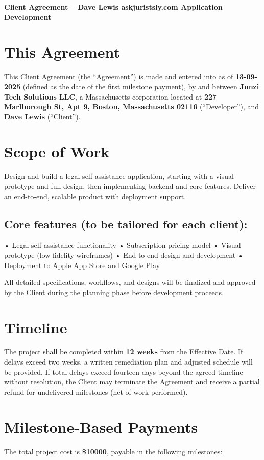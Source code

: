 \documentclass[11pt,letterpaper]{article}
\newcommand{\ClientName}{Dave Lewis}
\newcommand{\AppName}{askjuristsly.com}
\newcommand{\EffectiveDate}{13-09-2025}
\newcommand{\TimeLine}{12 weeks}
\newcommand{\TotalCost}{10000}
\newcommand{\FeaturesListPlaceholder}{• Legal self-assistance functionality
• Subscription pricing model
• Visual prototype (low-fidelity wireframes)
• End-to-end design and development
• Deployment to Apple App Store and Google Play}
\newcommand{\ScopeDescription}{Design and build a legal self-assistance application, starting with a visual prototype and full design, then implementing backend and core features. Deliver an end-to-end, scalable product with deployment support.}
\begin{document}
\begin{center}
\Large\textbf{Client Agreement -- \ClientName{} \AppName{} Application Development}
\end{center}

\vspace{1em}

\section*{This Agreement}
This Client Agreement (the ``Agreement'') is made and entered into as of \textbf{\EffectiveDate{}} (defined as the date of the first milestone payment), by and between \textbf{Junzi Tech Solutions LLC}, a Massachusetts corporation located at \textbf{227 Marlborough St, Apt 9, Boston, Massachusetts 02116} (``Developer''), and \textbf{\ClientName{}} (``Client'').

\section{Scope of Work}
\ScopeDescription{}

\subsection*{Core features (to be tailored for each client):}
\FeaturesListPlaceholder{}

All detailed specifications, workflows, and designs will be finalized and approved by the Client during the planning phase before development proceeds.

\section{Timeline}
The project shall be completed within \textbf{\TimeLine{}} from the Effective Date. If delays exceed two weeks, a written remediation plan and adjusted schedule will be provided. If total delays exceed fourteen days beyond the agreed timeline without resolution, the Client may terminate the Agreement and receive a partial refund for undelivered milestones (net of work performed).

\section{Milestone-Based Payments}
The total project cost is \textbf{\$\TotalCost{}}, payable in the following milestones:
\end{document}

